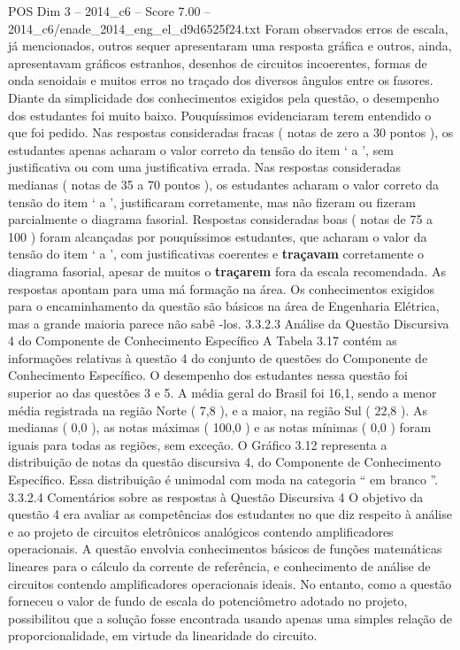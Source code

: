 \begin{textsample}{POS Dim 3 – 2014\_c6 – Score 7.00 – 2014\_c6/enade\_2014\_eng\_el\_d9d6525f24.txt}
Foram observados erros de escala, já mencionados, outros sequer apresentaram uma resposta gráfica e outros, ainda, apresentavam gráficos estranhos, desenhos de circuitos incoerentes, formas de onda senoidais e muitos erros no traçado dos diversos ângulos entre os fasores.
Diante da simplicidade dos conhecimentos exigidos pela questão, o desempenho dos estudantes foi muito baixo.
Pouquíssimos evidenciaram terem entendido o que foi pedido.
Nas respostas consideradas fracas ( notas de zero a 30 pontos ), os estudantes apenas acharam o valor correto da tensão do item ‘ a ’, sem justificativa ou com uma justificativa errada.
Nas respostas consideradas medianas ( notas de 35 a 70 pontos ), os estudantes acharam o valor correto da tensão do item ‘ a ’, justificaram corretamente, mas não fizeram ou fizeram parcialmente o diagrama fasorial.
Respostas consideradas boas ( notas de 75 a 100 ) foram alcançadas por pouquíssimos estudantes, que acharam o valor da tensão do item ‘ a ’, com justificativas coerentes e \textbf{traçavam} corretamente o diagrama fasorial, apesar de muitos o \textbf{traçarem} fora da escala recomendada.
As respostas apontam para uma má formação na área.
Os conhecimentos exigidos para o encaminhamento da questão são básicos na área de Engenharia Elétrica, mas a grande maioria parece não sabê -los. 3.3.2.3 Análise da Questão Discursiva 4 do Componente de Conhecimento Específico A Tabela 3.17 contém as informações relativas à questão 4 do conjunto de questões do Componente de Conhecimento Específico.
O desempenho dos estudantes nessa questão foi superior ao das questões 3 e 5.
A média geral do Brasil foi 16,1, sendo a menor média registrada na região Norte ( 7,8 ), e a maior, na região Sul ( 22,8 ).
As medianas ( 0,0 ), as notas máximas ( 100,0 ) e as notas mínimas ( 0,0 ) foram iguais para todas as regiões, sem exceção.
O Gráfico 3.12 representa a distribuição de notas da questão discursiva 4, do Componente de Conhecimento Específico.
Essa distribuição é unimodal com moda na categoria “ em branco ”. 3.3.2.4 Comentários sobre as respostas à Questão Discursiva 4 O objetivo da questão 4 era avaliar as competências dos estudantes no que diz respeito à análise e ao projeto de circuitos eletrônicos analógicos contendo amplificadores operacionais.
A questão envolvia conhecimentos básicos de funções matemáticas lineares para o cálculo da corrente de referência, e conhecimento de análise de circuitos contendo amplificadores operacionais ideais.
No entanto, como a questão forneceu o valor de fundo de escala do potenciômetro adotado no projeto, possibilitou que a solução fosse encontrada usando apenas uma simples relação de proporcionalidade, em virtude da linearidade do circuito.

\end{textsample}
